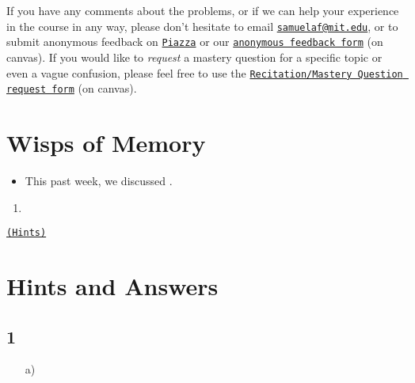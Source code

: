 \documentclass[12pt]{article}
\makeatletter
\def \piazza{https://piazza.com/class/}
\def \feedbackform{https://docs.google.com/forms/d/e/}
\def \requestform{https://docs.google.com/forms/d/e/}
\def \MQDisclaimer{
If you have any comments about the problems, or if we can help your experience in the course in any way, please don't hesitate to email \href{mailto:samuelaf@mit.edu}{\texttt{samuelaf@mit.edu}}, or to submit anonymous feedback on \href{\piazza}{\texttt{Piazza}} or our \href{\feedbackform}{\texttt{anonymous feedback form}} (on canvas).
%
If you would like to \textit{request} a mastery question for a specific topic or even a vague confusion, please feel free to use the \href{\requestform}{\texttt{Recitation/Mastery Question request form}} (on canvas).
}
\makeatother
\begin{document}
\MQDisclaimer


\section*{Wisps of Memory}
\begin{itemize}
    \item
    This past week, we discussed .
\end{itemize}


\renewcommand{\contentsname}{Mastery Questions}
\tableofcontents

\newpage


\MQ{} %
{
}
{
}
{
\begin{enumerate}[label=\alph*)]
    \item
\end{enumerate}

\hyperref[hint:]{\texttt{(Hints)}}
}

\newpage


\section*{Hints and Answers}

\subsection*{1~~~}
\label{hint:}
\begin{enumerate}
    \item[a)]
\end{enumerate}
\end{document}
